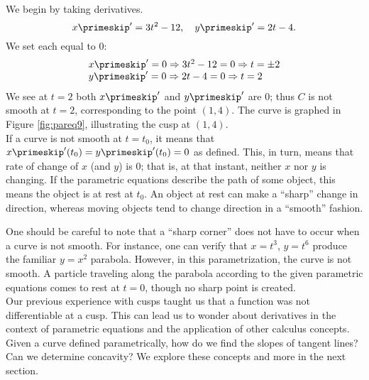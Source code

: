 {We begin by taking derivatives. 
$$x\primeskip' = 3t^2-12,\quad y\primeskip' = 2t-4.$$
We set each equal to 0:
$$\begin{array}{l}x\primeskip' = 0 \Rightarrow 3t^2-12=0 \Rightarrow t=\pm 2\\
  y\primeskip'=0 \Rightarrow 2t-4 = 0 \Rightarrow t=2
	\end{array}
	$$
We see at $t=2$ both $x\primeskip'$ and $y\primeskip'$ are 0; thus $C$ is not smooth at $t=2$, corresponding to the point $(1,4)$. The curve is graphed in Figure \ref{fig:pareq9}, illustrating the cusp at $(1,4)$.
}\\

If a curve is not smooth at $t=t_0$, it means that $x\primeskip'(t_0)=y\primeskip'(t_0)=0$ as defined. This, in turn, means that rate of change of $x$ (and $y$) is 0; that is, at that instant, neither $x$ nor $y$ is changing. If the parametric equations describe the path of some object, this means the object is at rest at $t_0$. An object at rest can make a ``sharp'' change in direction, whereas moving objects tend to change direction in a ``smooth'' fashion.

One should be careful to note that a ``sharp corner'' does not have to occur when a curve is not smooth. For instance, one can verify that $x=t^3$, $y=t^6$ produce the familiar $y=x^2$ parabola. However, in this parametrization, the curve is not smooth. A particle traveling along the parabola according to the given parametric equations comes to rest at $t=0$, though no sharp point is created.\\

Our previous experience with cusps taught us that a function was not differentiable at a cusp. This can lead us to wonder about derivatives in the context of parametric equations and the application of other calculus concepts. Given a curve defined parametrically, how do we find the slopes of tangent lines? Can we determine concavity? We explore these concepts and more in the next section.



